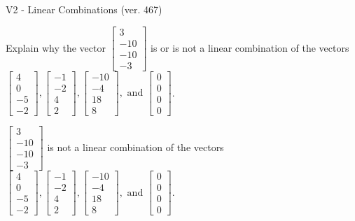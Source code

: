 \begin{exercise}
  \begin{exerciseTitle}V2 - Linear Combinations (ver. 467)\end{exerciseTitle}
  \begin{exerciseStatement}
    Explain why the vector \(\left[\begin{array}{c}
3 \\
-10 \\
-10 \\
-3
\end{array}\right]\)  is or is not a linear 
	combination of the vectors \(\left[\begin{array}{c}
4 \\
0 \\
-5 \\
-2
\end{array}\right] , \left[\begin{array}{c}
-1 \\
-2 \\
4 \\
2
\end{array}\right] , \left[\begin{array}{c}
-10 \\
-4 \\
18 \\
8
\end{array}\right] , \text{ and } \left[\begin{array}{c}
0 \\
0 \\
0 \\
0
\end{array}\right]\).
	


  \end{exerciseStatement}
  \begin{exerciseAnswer}
   \(\left[\begin{array}{c}
3 \\
-10 \\
-10 \\
-3
\end{array}\right]\) 
  	 is not  
	a linear combination of the vectors \(\left[\begin{array}{c}
4 \\
0 \\
-5 \\
-2
\end{array}\right] , \left[\begin{array}{c}
-1 \\
-2 \\
4 \\
2
\end{array}\right] , \left[\begin{array}{c}
-10 \\
-4 \\
18 \\
8
\end{array}\right] , \text{ and } \left[\begin{array}{c}
0 \\
0 \\
0 \\
0
\end{array}\right]\).


\end{exerciseAnswer}
\end{exercise}
